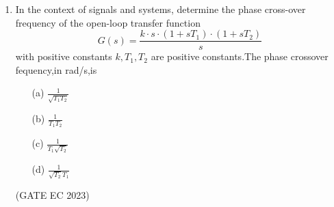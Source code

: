 \begin{enumerate}[label=\thechapter.\arabic*,ref=\thechapter.\theenumi]
\item In the context of signals and systems, determine the phase cross-over frequency of the open-loop transfer function
\[
G(s) = \frac{k \cdot s \cdot (1+sT_1) \cdot (1+sT_2)}{s}
\]
with positive constants $k, T_1, T_2$ are positive constants.The phase crossover fequency,in rad/s,is
\begin{enumerate}
  \item[(a)] $\frac{1}{\sqrt{T_1 T_2}}$
  \item[(b)] $\frac{1}{T_1 T_2}$
  \item[(c)] $\frac{1}{T_1\sqrt{T_2}}$
  \item[(d)] $\frac{1}{\sqrt{T_2}T_1}$
\end{enumerate}
\hfill{(GATE EC 2023)}
\solution
\newpage

\end{enumerate}

